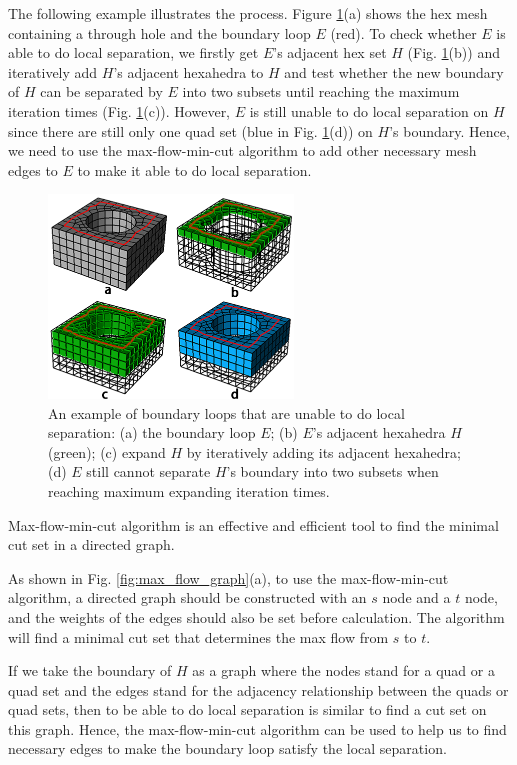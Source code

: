 \documentclass[final,5p,times,twocolumn]{elsarticle}
\begin{document}
The following example illustrates the process. Figure \ref{fig:local_sep_exam}(a) shows the hex mesh containing a through hole and the boundary loop $E$ (red). To check whether $E$ is able to do local separation, we firstly get $E$'s adjacent hex set $H$ (Fig. \ref{fig:local_sep_exam}(b)) and iteratively add $H$'s adjacent hexahedra to $H$ and test whether the new boundary of $H$ can be separated by $E$ into two subsets until reaching the maximum iteration times (Fig. \ref{fig:local_sep_exam}(c)). However, $E$ is still unable to do local separation on $H$ since there are still only one quad set (blue in Fig. \ref{fig:local_sep_exam}(d)) on $H$'s boundary. Hence, we need to use the max-flow-min-cut algorithm to add other necessary mesh edges to $E$ to make it able to do local separation.

\begin{figure}[htbp]
\begin{center}
\includegraphics[width=6.5cm]{figures/local_sep_exam.png}
\caption{An example of boundary loops that are unable to do local separation: (a) the boundary loop $E$; (b) $E$'s adjacent hexahedra $H$(green); (c) expand $H$ by iteratively adding its adjacent hexahedra; (d) $E$ still cannot separate $H$'s boundary into two subsets when reaching maximum expanding iteration times.}
\label{fig:local_sep_exam}
\end{center}
\end{figure}


Max-flow-min-cut algorithm is an effective and efficient tool to find the minimal cut set in a directed graph\cite{lawler20014}. 

As shown in Fig. \ref{fig:max_flow_graph}(a), to use the max-flow-min-cut algorithm, a directed graph should be constructed with an $s$ node and a $t$ node, and the weights of the edges should also be set before calculation. The algorithm will find a minimal cut set that determines the max flow from $s$ to $t$.

If we take the boundary of $H$ as a graph where the nodes stand for a quad or a quad set and the edges stand for the adjacency relationship between the quads or quad sets, then to be able to do local separation is similar to find a cut set on this graph. Hence, the max-flow-min-cut algorithm can be used to help us to find necessary edges to make the boundary loop satisfy the local separation.
\end{document}
